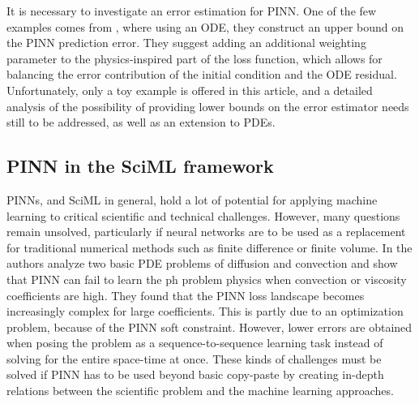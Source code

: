 \documentclass[pdflatex,sn-basic]{sn-jnl}%
\theoremstyle{thmstyleone}%
\theoremstyle{thmstyletwo}%
\theoremstyle{thmstylethree}%
\begin{document}
It is necessary to investigate an error estimation for PINN. 
One of the few examples comes from \cite{Hil2022_CertifiedMachineLearning_UngHU}, where
using an ODE, they construct an upper bound on the PINN prediction error.
They suggest adding an additional weighting parameter to the physics-inspired part of the loss function, which allows for balancing the error contribution of the initial condition and the ODE residual. 
Unfortunately, only a toy example is offered in this article, and a detailed analysis of the possibility of providing lower bounds on the error estimator needs still to be addressed, as well as an extension to PDEs.












\subsection{PINN in the SciML framework}\label{subsec_SciML}
PINNs, and SciML in general, hold a lot of potential for applying machine learning to critical scientific and technical challenges. 
%
However, many questions remain unsolved, particularly if neural networks are to be used as a replacement for traditional numerical methods such as finite difference or finite volume.
%
%
In
\cite{Kri2021_CharacterizingPossibleFailure_GhoKGZ}
the authors analyze two basic PDE problems of diffusion and convection and show that PINN can fail to learn the ph problem physics when convection or viscosity coefficients are high.
They found that the PINN loss landscape becomes increasingly complex for large coefficients.
This is partly due to an optimization problem, because of the PINN soft constraint.
However, lower errors are obtained when posing the problem as a sequence-to-sequence learning task instead of solving for the entire space-time at once.
%
These kinds of challenges must be solved if PINN has to be used beyond basic copy-paste by creating in-depth relations between the scientific problem and the machine learning approaches. 
\noindent
\\
\end{document}
